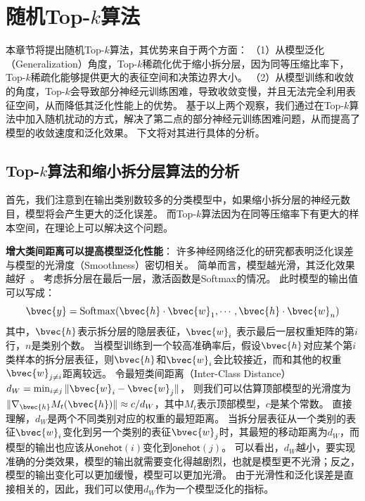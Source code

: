\section{随机Top-$k$算法}
\label{sec:randomized_topk:method}
本章节将提出随机Top-$k$算法，其优势来自于两个方面：
（1）从模型泛化（Generalization）角度，Top-$k$稀疏化优于缩小拆分层，因为同等压缩比率下，Top-$k$稀疏化能够提供更大的表征空间和决策边界大小。
（2）从模型训练和收敛的角度，Top-$k$会导致部分神经元训练困难，导致收敛变慢，并且无法完全利用表征空间，从而降低其泛化性能上的优势。
%
基于以上两个观察，我们通过在Top-$k$算法中加入随机扰动的方式，解决了第二点的部分神经元训练困难问题，从而提高了模型的收敛速度和泛化效果。
%
下文将对其进行具体的分析。

\subsection{Top-$k$算法和缩小拆分层算法的分析}
首先，我们注意到在输出类别数较多的分类模型中，如果缩小拆分层的神经元数目，模型将会产生更大的泛化误差。
而Top-$k$算法因为在同等压缩率下有更大的样本空间，在理论上可以解决这个问题。


\textbf{增大类间距离可以提高模型泛化性能}：
许多神经网络泛化的研究都表明泛化误差与模型的光滑度（Smoothness）密切相关。
%
简单而言，模型越光滑，其泛化效果越好~\cite{neysharbur2015norm_capacity,neysharbur2017generalization,gouk2021lipschitz_reg}。
%
考虑拆分层在最后一层，激活函数是Softmax的情况。
此时模型的输出值可以写成：
\begin{equation}
    \bvec{y} = \text{Softmax}(\bvec{h}\cdot \bvec{w}_1, \cdots, \bvec{h} \cdot \bvec{w}_n)
\end{equation}
其中，$\bvec{h}$表示拆分层的隐层表征，$\bvec{w}_i$ 表示最后一层权重矩阵的第$i$行，$n$是类别个数。
%
当模型训练到一个较高准确率后，假设$\bvec{h}$对应某个第$i$类样本的拆分层表征，则$\bvec{h}$和$\bvec{w}_i$会比较接近，而和其他的权重$\bvec{w}_{j\ne i}$距离较远。
%
令最短类间距离（Inter-Class Distance）$d_W = \min_{i\ne j} \Vert \bvec{w}_i - \bvec{w}_j \Vert$，
则我们可以估算顶部模型的光滑度为$\Vert \nabla_{\bvec{h}} M_t(\bvec{h}) \Vert \approx c/d_W$，其中$M_t$表示顶部模型，$c$是某个常数。
%
直接理解，$d_W$是两个不同类别对应的权重的最短距离。
当拆分层表征从一个类别的表征$\bvec{w}_i$变化到另一个类别的表征$\bvec{w}_j$时，其最短的移动距离为$d_W$，而模型的输出也应该从$\mathsf{onehot}(i)$变化到$\mathsf{onehot}(j)$。
%
可以看出，$d_W$越小，要实现准确的分类效果，模型的输出就需要变化得越剧烈，也就是模型更不光滑；反之，模型的输出变化可以更加缓慢，模型可以更加光滑。
%
由于光滑性和泛化误差是直接相关的，因此，我们可以使用$d_W$作为一个模型泛化的指标。
%


